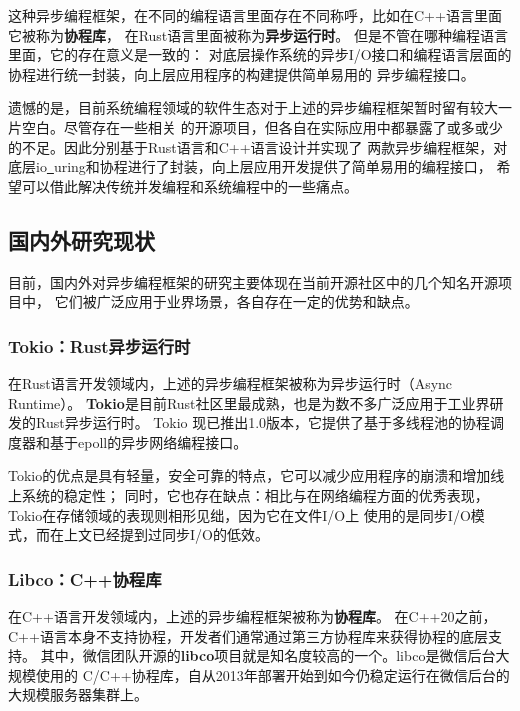 \documentclass[supercite]{HustGraduPaper}
\theoremstyle{definition}
\begin{document}
这种异步编程框架，在不同的编程语言里面存在不同称呼，比如在C++语言里面它被称为\textbf{协程库}，
在Rust语言里面被称为\textbf{异步运行时}\cite{rosendahl2017green}。
但是不管在哪种编程语言里面，它的存在意义是一致的：
对底层操作系统的异步I/O接口和编程语言层面的协程进行统一封装，向上层应用程序的构建提供简单易用的
异步编程接口。\par

遗憾的是，目前系统编程领域的软件生态对于上述的异步编程框架暂时留有较大一片空白。尽管存在一些相关
的开源项目，但各自在实际应用中都暴露了或多或少的不足。因此分别基于Rust语言\cite{klabnik2019rust}和C++语言设计并实现了
两款异步编程框架，对底层io\underline{~}uring和协程进行了封装，向上层应用开发提供了简单易用的编程接口，
希望可以借此解决传统并发编程和系统编程中的一些痛点。\par

\subsection{国内外研究现状}

目前，国内外对异步编程框架的研究主要体现在当前开源社区中的几个知名开源项目中，
它们被广泛应用于业界场景，各自存在一定的优势和缺点。

\subsubsection{Tokio：Rust异步运行时}
在Rust语言开发领域内，上述的异步编程框架被称为异步运行时（Async Runtime）。
\textbf{Tokio}是目前Rust社区里最成熟，也是为数不多广泛应用于工业界研发的Rust异步运行时。
Tokio 现已推出1.0版本，它提供了基于多线程池的协程调度器和基于epoll\cite{gammo2004comparing}的异步网络编程接口。\par

Tokio的优点是具有轻量，安全可靠的特点，它可以减少应用程序的崩溃和增加线上系统的稳定性；
同时，它也存在缺点：相比与在网络编程方面的优秀表现，Tokio在存储领域的表现则相形见绌，因为它在文件I/O上
使用的是同步I/O模式，而在上文已经提到过同步I/O的低效。\par

\subsubsection{Libco：C++协程库}
在C++语言开发领域内，上述的异步编程框架被称为\textbf{协程库}。
在C++20之前，C++语言本身不支持协程，开发者们通常通过第三方协程库来获得协程的底层支持。
其中，微信团队开源的\textbf{libco}项目就是知名度较高的一个。libco是微信后台大规模使用的
C/C++协程库，自从2013年部署开始到如今仍稳定运行在微信后台的大规模服务器集群上。\par
\end{document}
